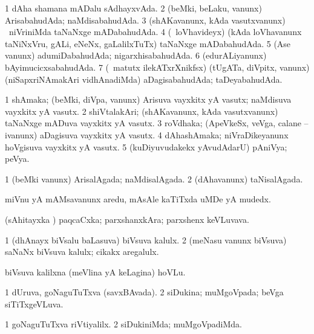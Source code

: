 \bentry
{} 
\gl{\gu}
\expl{}
\bmng
\bnum
\num{1} dAha shamana mADalu sAdhayxvAda. 
\num{2} (beMki, beLaku, \mo vanunx) ArisabahudAda; naMdisabahudAda. 
\num{3} (shAKavanunx, kAda vasutxvanunx) \kanmu\ niVriniMda taNaNxge mADabahudAda. 
\num{4} (\kanmu\ loVhavideyx) (kAda loVhavanunx taNiNxVru, gALi, eNeNx, \mo gaLalilxTuTx) taNaNxge mADabahudAda. 
\num{5} (Ase \mo vanunx) adumiDabahudAda; nigarxhisabahudAda. 
\num{6} (edurALiyanunx) bAyimucicxsabahudAda. 
\num{7} (\Bwvi\ matutx ilekATxrXnikfsx) (tUgATa, diVpitx, \mo vanunx) (niSapxriNAmakAri vidhAnadiMda) aDagisabahudAda; taDeyabahudAda. 
\enum
\emng
\eentry

\bentry
{} 
\gl{\nA}
\expl{}
\bmng
\bnum
\num{1} shAmaka; (beMki, diVpa, \mo vanunx) Arisuva vayxkitx yA vasutx; naMdisuva vayxkitx yA vasutx. 
\num{2} shiVtalakAri; (shAKavanunx, kAda vasutxvanunx) taNaNxge mADuva vayxkitx yA vasutx. 
\num{3} roVdhaka; (ApeVkeSx, veVga, calane -- ivanunx) aDagisuva vayxkitx yA vasutx. 
\num{4} dAhashAmaka; niVraDikeyanunx hoVgisuva vayxkitx yA vasutx. 
\num{5} (kuDiyuvudakekx yAvudAdarU) pAniVya; peVya. 
\enum
\emng
\eentry

\bentry
{} 
\gl{\gu}
\expl{}
\bmng
\bnum
\num{1} (beMki \mo vanunx) ArisalAgada; naMdisalAgada. 
\num{2} (dAhavanunx) taNisalAgada. 
\enum
\emng
\eentry

\bentry
{} 
\gl{\nA}
\expl{}
\bmng
miVnu yA mAMsavanunx aredu, mAsAle kaTiTxda uMDe yA mudedx. 
\emng
\eentry

\bentry
{} 
\gl{\nA}
\expl{ }
\bmng
(sAhitayxka \parx) paqcaCxka; parxshanxkAra; parxshenx keVLuvava. 
\emng
\eentry

\bentry
{} 
\gl{\nA}
\expl{}
\bmng
\bnum
\num{1} (dhAnayx biVsalu baLasuva) biVsuva kalulx. 
\num{2} (meNasu \mo vanunx biVsuva) saNaNx biVsuva kalulx; cikakx aregalulx. 
\enum
\emng
\eentry

\bentry
{}
\gl{\nA}
\bmng
biVsuva kalilxna (meVlina yA keLagina) hoVLu. 
\emng
\eentry

\bentry
{}
\gl{\gu}
\bmng
\bnum
\num{1} dUruva, goNaguTuTxva (savxBAvada). 
\num{2} siDukina; muMgoVpada; beVga siTiTxgeVLuva. 
\enum
\emng
\eentry

\bentry
{}
\gl{\kirxvi}
\bmng
\bnum
\num{1} goNaguTuTxva riVtiyalilx. 
\num{2} siDukiniMda; muMgoVpadiMda. 
\enum
\emng
\eentry

